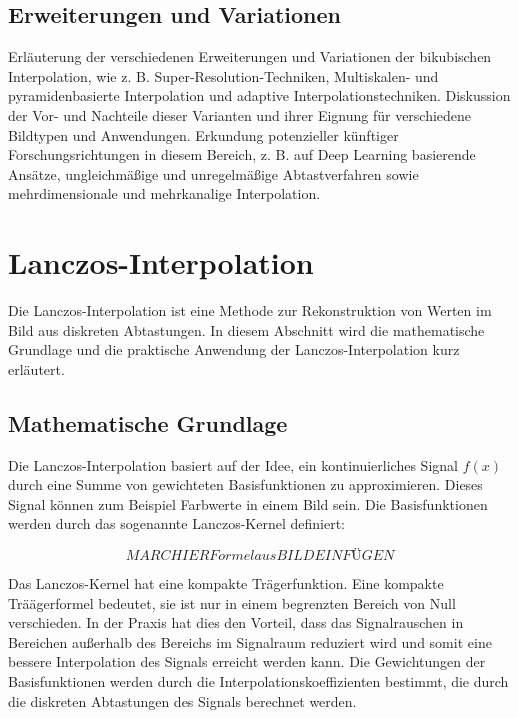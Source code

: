     \subsection{Erweiterungen und Variationen}

    Erläuterung der verschiedenen Erweiterungen und Variationen der bikubischen Interpolation, wie z. B. Super-Resolution-Techniken, Multiskalen- und pyramidenbasierte Interpolation und adaptive Interpolationstechniken.
    Diskussion der Vor- und Nachteile dieser Varianten und ihrer Eignung für verschiedene Bildtypen und Anwendungen.
    Erkundung potenzieller künftiger Forschungsrichtungen in diesem Bereich, z. B. auf Deep Learning basierende Ansätze, ungleichmäßige und unregelmäßige Abtastverfahren sowie mehrdimensionale und mehrkanalige Interpolation.


\section{Lanczos-Interpolation}
Die Lanczos-Interpolation ist eine Methode zur Rekonstruktion von Werten im Bild aus diskreten Abtastungen. 
In diesem Abschnitt wird die mathematische Grundlage und die praktische Anwendung der Lanczos-Interpolation kurz erläutert.

\subsection{Mathematische Grundlage}

Die Lanczos-Interpolation basiert auf der Idee, ein kontinuierliches Signal $f(x)$ durch eine Summe von gewichteten Basisfunktionen zu approximieren. 
Dieses Signal können zum Beispiel Farbwerte in einem Bild sein.
Die Basisfunktionen werden durch das sogenannte Lanczos-Kernel definiert:

\begin{equation}
MARC HIER Formel aus BILD EINFÜGEN
\end{equation}

Das Lanczos-Kernel hat eine kompakte Trägerfunktion.
Eine kompakte Träägerformel bedeutet, sie ist nur in einem begrenzten Bereich von Null verschieden. 
In der Praxis hat dies den Vorteil, dass das Signalrauschen in Bereichen außerhalb des Bereichs im Signalraum reduziert wird und somit eine bessere Interpolation des Signals erreicht werden kann.
Die Gewichtungen der Basisfunktionen werden durch die Interpolationskoeffizienten bestimmt, die durch die diskreten Abtastungen des Signals berechnet werden.

